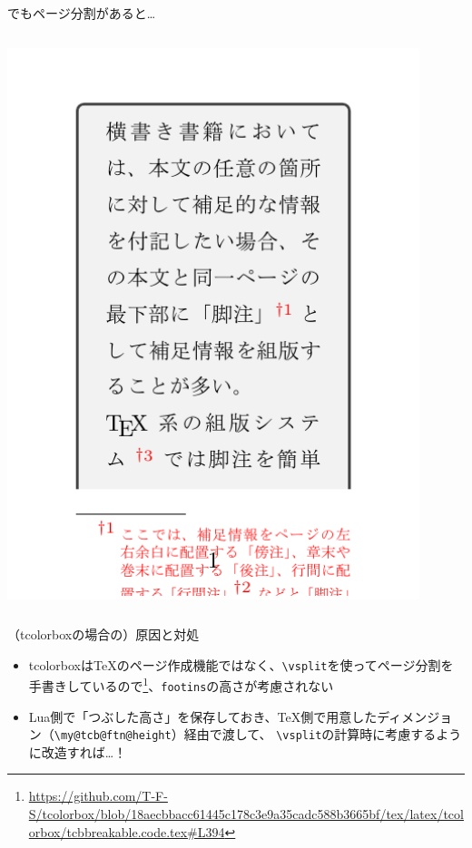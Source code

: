 \documentclass[unicode,14pt]{beamer}
\begin{document}
\begin{frame}[t]{でもページ分割があると…}
\begin{columns}
\begin{column}{0.45\textwidth}
\colorbox{white}{\includegraphics[width=0.9\textwidth, page=2]{codes/history5.pdf}}
\end{column}
\end{columns}
\end{frame}

\begin{frame}[t]{（tcolorboxの場合の）原因と対処}
\begin{itemize}
\item tcolorboxは\TeX{}のページ作成機能ではなく、\texttt{\textbackslash{}vsplit}を使ってページ分割を手書きしているので\footnote{\url{https://github.com/T-F-S/tcolorbox/blob/18aecbbacc61445c178c3e9a35cadc588b3665bf/tex/latex/tcolorbox/tcbbreakable.code.tex\#L394}}、\texttt{footins}の高さが考慮されない
\item Lua側で「つぶした高さ」を保存しておき、\TeX{}側で用意したディメンジョン（\texttt{\textbackslash{}my@tcb@ftn@height}）経由で渡して、
\texttt{\textbackslash{}vsplit}の計算時に考慮するように改造すれば…！
\end{itemize}
\end{frame}
\end{document}

